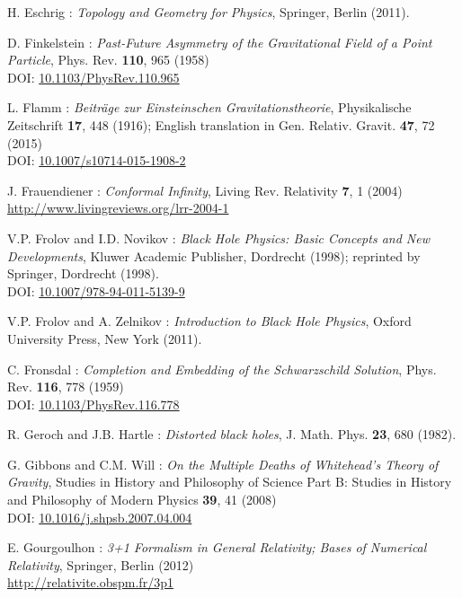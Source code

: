 \begin{thebibliography}{123}
H. Eschrig : {\em Topology and Geometry for Physics},
Springer, Berlin (2011).

D. Finkelstein :
{\em Past-Future Asymmetry of the Gravitational Field of a Point Particle},
Phys. Rev. {\bf 110}, 965 (1958)\\
DOI: \href{http://dx.doi.org/10.1103/PhysRev.110.965}{10.1103/PhysRev.110.965}

L. Flamm : {\em Beiträge zur Einsteinschen Gravitationstheorie},
Physikalische Zeitschrift {\bf 17}, 448 (1916); English translation in
Gen. Relativ. Gravit. {\bf 47}, 72 (2015)\\
DOI: \href{http://dx.doi.org/10.1007/s10714-015-1908-2}{10.1007/s10714-015-1908-2}

J. Frauendiener :
{\em Conformal Infinity},
Living Rev. Relativity {\bf 7}, 1 (2004) \\
\url{http://www.livingreviews.org/lrr-2004-1}

V.P. Frolov and I.D. Novikov : {\em Black Hole Physics:
Basic Concepts and New Developments},
Kluwer Academic Publisher, Dordrecht (1998); reprinted by
Springer, Dordrecht (1998). \\
DOI: \href{http://dx.doi.org/10.1007/978-94-011-5139-9}{10.1007/978-94-011-5139-9}

V.P. Frolov and A. Zelnikov : {\em Introduction to Black Hole Physics},
Oxford University Press, New York (2011).

C. Fronsdal : {\em Completion and Embedding of the Schwarzschild Solution},
Phys. Rev. {\bf 116}, 778 (1959) \\
DOI: \href{https://doi.org/10.1103/PhysRev.116.778}{10.1103/PhysRev.116.778}

R. Geroch and J.B. Hartle : {\em Distorted black holes},
J. Math. Phys. {\bf 23}, 680 (1982).

G. Gibbons and C.M. Will : {\em On the Multiple Deaths of Whitehead's Theory of Gravity},
Studies in History and Philosophy of Science Part B: Studies in History and Philosophy of Modern Physics {\bf 39}, 41 (2008)\\
DOI: \href{https://doi.org/10.1016/j.shpsb.2007.04.004}{10.1016/j.shpsb.2007.04.004}

E. Gourgoulhon : {\em 3+1 Formalism in General Relativity; Bases of Numerical Relativity},
Springer, Berlin (2012)\\
\url{http://relativite.obspm.fr/3p1}


\end{thebibliography}
